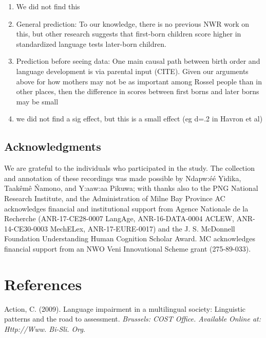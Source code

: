 \documentclass[english,,man,floatsintext]{apa6}
\begin{document}
\begin{enumerate}
\item
  We did not find this
\item
  General prediction: To our knowledge, there is no previous NWR work on this, but other research suggests that first-born children score higher in standardized language tests later-born children.
\item
  Prediction before seeing data: One main causal path between birth order and language development is via parental input (CITE). Given our arguments above for how mothers may not be as important among Rossel people than in other places, then the difference in scores between first borns and later borns may be small
\item
  we did not find a sig effect, but this is a small effect (eg d=.2 in Havron et al)
\end{enumerate}

\newpage

\hypertarget{acknowledgments}{%
\subsection{Acknowledgments}\label{acknowledgments}}

We are grateful to the individuals who participated in the study. The collection and annotation of these recordings was made possible by Ndapw:éé Yidika, Taakêmê Ńamono, and Y:aaw:aa Pikuwa; with thanks also to the PNG National Research Institute, and the Administration of Milne Bay Province AC acknowledges financial and institutional support from Agence Nationale de la Recherche (ANR-17-CE28-0007 LangAge, ANR-16-DATA-0004 ACLEW, ANR-14-CE30-0003 MechELex, ANR-17-EURE-0017) and the J. S. McDonnell Foundation Understanding Human Cognition Scholar Award. MC acknowledges financial support from an NWO Veni Innovational Scheme grant (275-89-033).

\hypertarget{references}{%
\section{References}\label{references}}

\setlength{\parindent}{-0.5in}
\setlength{\leftskip}{0.5in}

\hypertarget{refs}{}
\leavevmode\hypertarget{ref-is08042009language}{}%
Action, C. (2009). Language impairment in a multilingual society: Linguistic patterns and the road to assessment. \emph{Brussels: COST Office. Available Online at: Http://Www. Bi-Sli. Org}.
\end{document}
